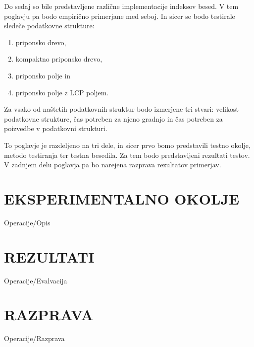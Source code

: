 Do sedaj so bile predstavljene različne implementacije indeksov besed. V tem poglavju pa bodo empirično primerjane med seboj. In sicer se bodo testirale sledeče podatkovne strukture:
\begin{enumerate}
        \item priponsko drevo, %
        \item kompaktno priponsko drevo, 
        \item priponsko polje in 
        \item priponsko polje z LCP poljem.
\end{enumerate}
Za vsako od naštetih podatkovnih struktur bodo izmerjene tri stvari: velikost podatkovne strukture, čas potreben za njeno gradnjo in čas potreben za poizvedbe v podatkovni strukturi.

To poglavje je razdeljeno na tri dele, in sicer prvo bomo predstavili testno okolje, metodo testiranja ter testna besedila. Za tem bodo predstavljeni rezultati testov. V zadnjem delu poglavja pa bo narejena razprava rezultatov primerjav.

\section{EKSPERIMENTALNO OKOLJE}\label{sec:opis}
{Operacije/Opis}


\section{REZULTATI}\label{sec:primerjava}
{Operacije/Evalvacija}

\section{RAZPRAVA}\label{sec:razprava}
{Operacije/Razprava}